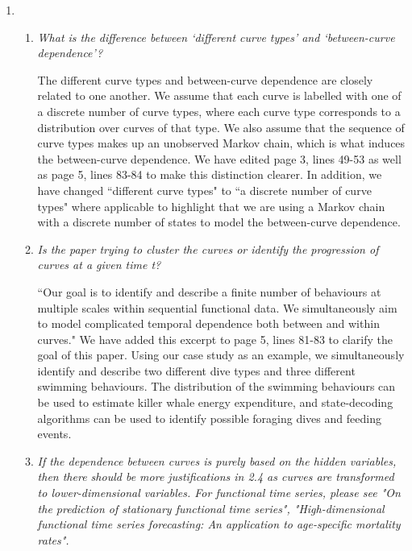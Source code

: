 \documentclass{article}
\begin{document}
\begin{enumerate}
    \item 
    \begin{enumerate}
        \item \textit{What is the difference between `different curve types' and `between-curve dependence'?} 
        
        The different curve types and between-curve dependence are closely related to one another. We assume that each curve is labelled with one of a discrete number of curve types, where each curve type corresponds to a distribution over curves of that type. We also assume that the sequence of curve types makes up an unobserved Markov chain, which is what induces the between-curve dependence. We have edited page 3, lines 49-53 as well as page 5, lines 83-84 to make this distinction clearer. In addition, we have changed ``different curve types" to ``a discrete number of curve types" where applicable to highlight that we are using a Markov chain with a discrete number of states to model the between-curve dependence. 
        
        \item \textit{Is the paper trying to cluster the curves or identify the progression of curves at a given time t?} 
        
        ``Our goal is to identify and describe a finite number of behaviours at multiple scales within sequential functional data. We simultaneously aim to model complicated temporal dependence both between and within curves." We have added this excerpt to page 5, lines 81-83 to clarify the goal of this paper. Using our case study as an example, we simultaneously identify and describe two different dive types and three different swimming behaviours. The distribution of the swimming behaviours can be used to estimate killer whale energy expenditure, and state-decoding algorithms can be used to identify possible foraging dives and feeding events. 
        
        \item \textit{If the dependence between curves is purely based on the hidden variables, then there should be more justifications in 2.4 as curves are transformed to lower-dimensional variables. For functional time series, please see "On the prediction of stationary functional time series", "High-dimensional functional time series forecasting: An application to age-specific mortality rates".} 
        

\end{enumerate}
\end{enumerate}
\end{document}
